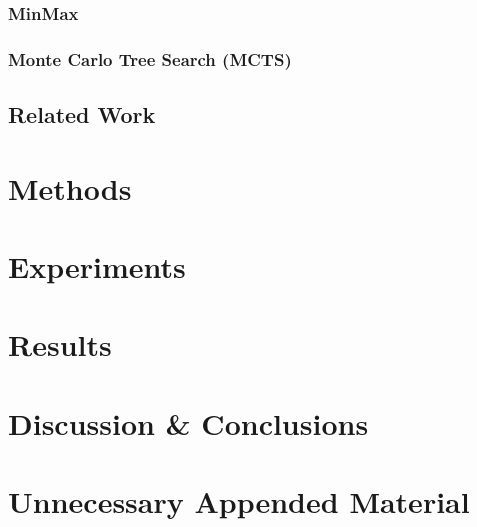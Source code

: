 \documentclass{kththesis}
\theoremstyle{definition}
\begin{document}
\subsection{MinMax}

\subsection{Monte Carlo Tree Search (MCTS)}

\section{Related Work}


\chapter{Methods}

\chapter{Experiments}

\chapter{Results}

\chapter{Discussion \& Conclusions}

\printbibliography[heading=bibintoc] %

\appendix

\chapter{Unnecessary Appended Material}
\end{document}
